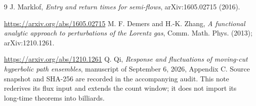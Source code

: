 \documentclass[11pt,reqno]{amsart}
\numberwithin{equation}{section}
\theoremstyle{remark}\newtheorem{remark}[theorem]{Remark}
\begin{document}
\begin{thebibliography}{9}
 J. Marklof, \emph{Entry and return times for semi-flows}, arXiv:1605.02715 (2016).\par\url{https://arxiv.org/abs/1605.02715}
 M. F. Demers and H.-K. Zhang, \emph{A functional analytic approach to perturbations of the Lorentz gas}, Comm. Math. Phys. (2013); arXiv:1210.1261.\par\url{https://arxiv.org/abs/1210.1261}
 Q. Qi, \emph{Response and fluctuations of moving-cut hyperbolic path ensembles}, manuscript of September 6, 2026, Appendix C. Source snapshot and SHA-256 are recorded in the accompanying audit. This note rederives its flux input and extends the count window; it does not import its long-time theorems into billiards.
\end{thebibliography}
\end{document}
